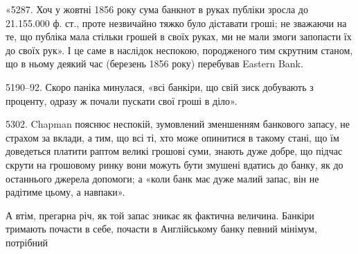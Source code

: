«5287. Хоч у жовтні 1856 року сума банкнот в руках публіки зросла
до 21.155.000 ф. ст., проте незвичайно тяжко було діставати гроші; не зважаючи
на те, що публіка мала стільки грошей в своїх руках, ми не мали змоги запопасти
їх до своїх рук». І це саме в наслідок неспокою, породженого тим
скрутним станом, що в ньому деякий час (березень 1856 року) перебував
Eastern Bank.

5190--92. Скоро паніка минулася, «всі банкіри, що свій зиск добувають
з проценту, одразу ж почали пускати свої гроші в діло».

5302. Chapman пояснює неспокій, зумовлений зменшенням банкового
запасу, не страхом за вклади, а тим, що всі ті, хто може опинитися в такому
стані, що їм доведеться платити раптом великі грошові суми, знають дуже добре,
що підчас скрути на грошовому ринку вони можуть бути змушені вдатись до
банку, як до останнього джерела допомоги; а «коли банк має дуже малий запас,
він не радітиме цьому, а навпаки».

А втім, прегарна річ, як той запас зникає як фактична величина. Банкіри
тримають почасти в себе, почасти в Англійському банку певний мінімум, потрібний
\parbreak{}  %
